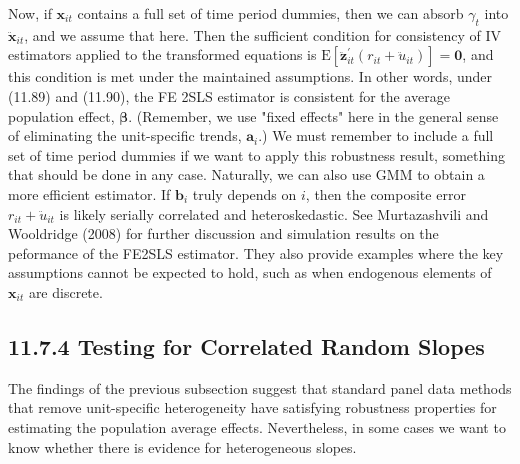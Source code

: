 \documentclass[10pt]{article}
\begin{document}
Now, if $\mathbf{x}_{i t}$ contains a full set of time period dummies, then we can absorb $\gamma_{t}$ into $\ddot{\mathbf{x}}_{i t}$, and we assume that here. Then the sufficient condition for consistency of IV estimators applied to the transformed equations is $\mathrm{E}\left[\ddot{\mathbf{z}}_{i t}^{\prime}\left(r_{i t}+\ddot{u}_{i t}\right)\right]=\mathbf{0}$, and this condition is met under the maintained assumptions. In other words, under (11.89) and (11.90), the FE 2SLS estimator is consistent for the average population effect, $\boldsymbol{\beta}$. (Remember, we use "fixed effects" here in the general sense of eliminating the unit-specific trends, $\mathbf{a}_{i}$.) We must remember to include a full set of time period dummies if we want to apply this robustness result, something that should be done in any case. Naturally, we can also use GMM to obtain a more efficient estimator. If $\mathbf{b}_{i}$ truly depends on $i$, then the composite error $r_{i t}+\ddot{u}_{i t}$ is likely serially correlated and heteroskedastic. See Murtazashvili and Wooldridge (2008) for further discussion and simulation results on the peformance of the FE2SLS estimator. They also provide examples where the key assumptions cannot be expected to hold, such as when endogenous elements of $\mathbf{x}_{i t}$ are discrete.

\subsection*{11.7.4 Testing for Correlated Random Slopes}
The findings of the previous subsection suggest that standard panel data methods that remove unit-specific heterogeneity have satisfying robustness properties for estimating the population average effects. Nevertheless, in some cases we want to know whether there is evidence for heterogeneous slopes.
\end{document}
